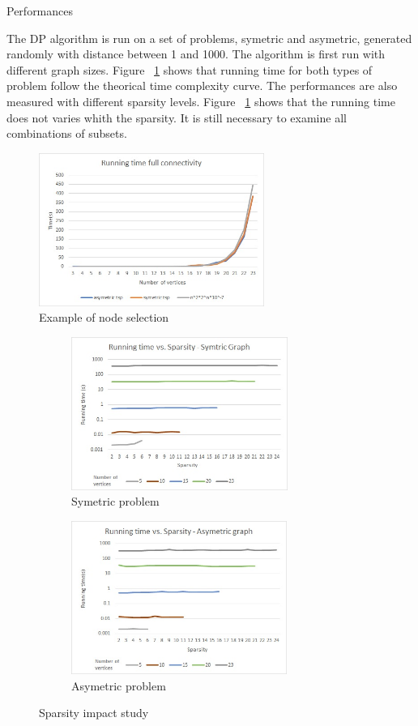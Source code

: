 \documentclass[../report.tex]{subfiles}
\begin{document}
\begin{subsection}{Performances}

The DP algorithm is run on a set of problems, symetric and asymetric, generated randomly with distance between 1 and 1000. 
The algorithm is first run with different graph sizes. Figure ~\ref{fig:dpgraphsize} shows that running time for both types of problem follow the theorical time complexity curve.
The performances are also measured with different sparsity levels. Figure ~\ref{fig:dpgraphsize} shows that the running time does not varies whith the sparsity. It is still necessary to examine all combinations of subsets.


\begin{figure}[H]
\centering
\includegraphics[height=5cm,valign=t]{dp_sizegraph.jpg}
\caption{Example of node selection \label{fig:dpgraphsize}}
\end{figure}

\begin{figure}[H]
\centering
\begin{subfigure}{.5\textwidth}
\includegraphics[height=5cm,valign=t]{dp_sym_sparsity.jpg}
\caption{Symetric problem \label{fig:dpgsparsitysym}}
\end{subfigure}%
\begin{subfigure}{.5\textwidth}
\includegraphics[height=5cm,valign=t]{dp_asym_sparsity.jpg}
\caption{Asymetric problem\label{fig:dpgsparsityasym}}
\end{subfigure}%
\caption{Sparsity impact study\label{fig:dpperf}}
\end{figure}


\end{subsection}
\end{document}
